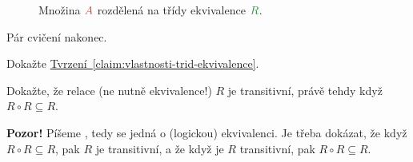 \begin{example}
\begin{figure}[H]
  \caption{Množina $\clr{A}$ rozdělená na třídy ekvivalence $\clg{R}$.}
  \label{fig:rozdeleni-na-tridy}
 \end{figure}
\end{example}

Pár cvičení nakonec.

\begin{exercise}
 Dokažte
 \hyperref[claim:vlastnosti-trid-ekvivalence]{Tvrzení~\ref*{claim:vlastnosti-trid-ekvivalence}}.
\end{exercise}

\begin{exercise}
 Dokažte, že relace (ne nutně ekvivalence!) $R$ je transitivní, právě tehdy když
 $R \circ R \subseteq R$.

 \textbf{Pozor!} Píšeme , tedy se jedná o (logickou)
 ekvivalenci. Je třeba dokázat, že když $R \circ R \subseteq R$, pak $R$ je
 transitivní, a že když je $R$ transitivní, pak $R \circ R \subseteq R$.
\end{exercise}
